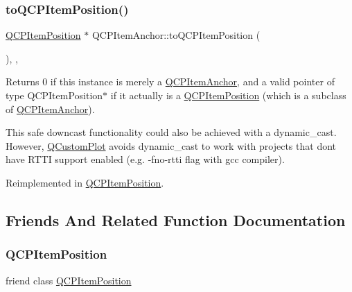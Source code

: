 \mbox{\label{class_q_c_p_item_anchor_ac54b20120669950255a63587193dbb86}} 
\subsubsection{\texorpdfstring{toQCPItemPosition()}{toQCPItemPosition()}}
{\footnotesize\ttfamily \mbox{\hyperlink{class_q_c_p_item_position}{Q\+C\+P\+Item\+Position}} $\ast$ Q\+C\+P\+Item\+Anchor\+::to\+Q\+C\+P\+Item\+Position (\begin{DoxyParamCaption}{ }\end{DoxyParamCaption})\hspace{0.3cm}{\ttfamily [inline]}, {\ttfamily [protected]}, {\ttfamily [virtual]}}

Returns 0 if this instance is merely a \mbox{\hyperlink{class_q_c_p_item_anchor}{Q\+C\+P\+Item\+Anchor}}, and a valid pointer of type Q\+C\+P\+Item\+Position$\ast$ if it actually is a \mbox{\hyperlink{class_q_c_p_item_position}{Q\+C\+P\+Item\+Position}} (which is a subclass of \mbox{\hyperlink{class_q_c_p_item_anchor}{Q\+C\+P\+Item\+Anchor}}).

This safe downcast functionality could also be achieved with a dynamic\+\_\+cast. However, \mbox{\hyperlink{class_q_custom_plot}{Q\+Custom\+Plot}} avoids dynamic\+\_\+cast to work with projects that don\textquotesingle{}t have R\+T\+TI support enabled (e.\+g. -\/fno-\/rtti flag with gcc compiler). 

Reimplemented in \mbox{\hyperlink{class_q_c_p_item_position_a008ff9ebe645a963671b68bcf7f7a1c0}{Q\+C\+P\+Item\+Position}}.



\subsection{Friends And Related Function Documentation}
\mbox{\label{class_q_c_p_item_anchor_aa9b8ddc062778e202a0be06a57d18d17}} 
\subsubsection{\texorpdfstring{QCPItemPosition}{QCPItemPosition}}
{\footnotesize\ttfamily friend class \mbox{\hyperlink{class_q_c_p_item_position}{Q\+C\+P\+Item\+Position}}\hspace{0.3cm}{\ttfamily [friend]}}



